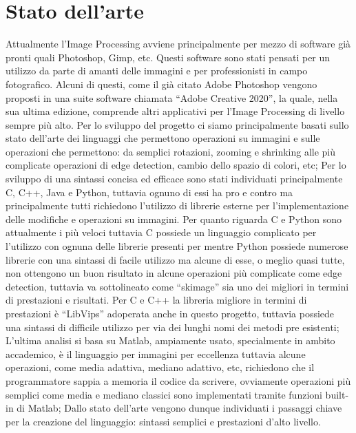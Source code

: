 \documentclass[10pt]{article}
\begin{document}
\section{Stato dell'arte}Attualmente l’Image Processing avviene principalmente per mezzo di software già pronti quali Photoshop, Gimp, etc. Questi software sono stati pensati per un utilizzo da parte di amanti delle immagini e per professionisti in campo fotografico. Alcuni di questi, come il già citato Adobe Photoshop vengono proposti in una suite software chiamata “Adobe Creative 2020”, la quale, nella sua ultima edizione, comprende altri applicativi per l’Image Processing di livello sempre più alto.
Per lo sviluppo del progetto ci siamo principalmente basati sullo stato dell’arte dei linguaggi che permettono operazioni su immagini e sulle operazioni che permettono: da semplici  rotazioni, zooming e shrinking alle più complicate operazioni di edge detection, cambio dello spazio di colori, etc;
Per lo sviluppo di una sintassi concisa ed efficace sono stati individuati principalmente C, C++, Java e Python, tuttavia ognuno di essi ha pro e contro ma principalmente tutti richiedono l’utilizzo di librerie esterne per l’implementazione delle modifiche e operazioni su immagini. Per quanto riguarda C e Python sono attualmente i più veloci tuttavia C possiede un linguaggio complicato per l’utilizzo con ognuna delle librerie presenti per mentre Python possiede numerose librerie con una sintassi di facile utilizzo ma alcune di esse, o meglio quasi tutte, non ottengono un buon risultato in alcune operazioni più complicate come edge detection, tuttavia va sottolineato come “skimage” sia uno dei migliori in termini di prestazioni e risultati. Per C e C++ la libreria migliore in termini di prestazioni è “LibVips” adoperata anche in questo progetto, tuttavia possiede una sintassi di difficile utilizzo per via dei lunghi nomi dei metodi pre esistenti; L’ultima analisi si basa su Matlab, ampiamente usato, specialmente in ambito accademico, è il linguaggio per immagini per eccellenza tuttavia alcune operazioni, come media adattiva, mediano adattivo, etc, richiedono che il programmatore sappia a memoria il codice da scrivere, ovviamente operazioni più semplici come media e mediano classici sono implementati tramite funzioni built-in di Matlab;
Dallo stato dell’arte vengono dunque individuati i passaggi chiave per la creazione del linguaggio: sintassi semplici e prestazioni d’alto livello.
\end{document}

